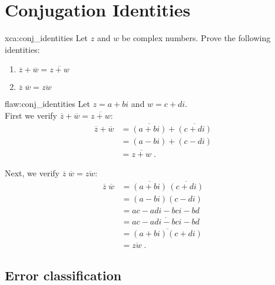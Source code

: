 
\section{Conjugation Identities}

\begin{xca}{xca:conj_identities}
Let $z$ and $w$ be complex numbers. Prove the following identities:
\begin{enumerate}
    \item $\overline{z} + \overline{w} = \overline{z+w}$
    \item $\overline{z}\; \overline{w} = \overline{zw}$
\end{enumerate}

\end{xca}

\begin{flaw}{flaw:conj_identities} %
Let $z=a+bi$ and $w=c+di$. \\

First we verify $\overline{z} + \overline{w} = \overline{z+w}$:
\begin{align*}
    \overline{z} + \overline{w} &= \overline{(a+bi)} + \overline{(c+di)} \\
    &= (a-bi) + (c-di) \\
    &= \overline{z+w}\;.
\end{align*}

Next, we verify $\overline{z}\; \overline{w} = \overline{zw}$:
\begin{align*}
    \overline{z}\;\overline{w} &= \overline{(a+bi)} \,\overline{(c+di)} \\
    &= (a-bi)(c-di) \\
    &= ac - adi - bci - bd\\
    &= \overline{ac - adi - bci - bd}\\
    &= \overline{(a+bi)(c+di)} \\
    &= \overline{zw}\;.
\end{align*}
\end{flaw}

\clearpage
\subsection{Error classification}

